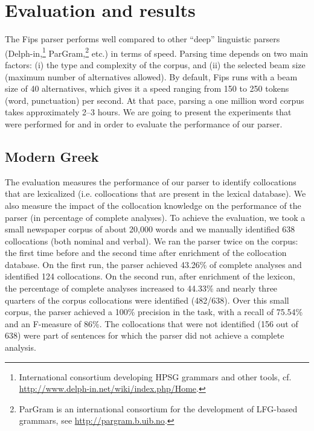 \documentclass[output=paper]{langsci/langscibook}
\begin{document}
\section{Evaluation and results}
\label{fou:sec6}
The Fips parser performs well compared to other ``deep'' linguistic parsers (Delph-in,\footnote{International consortium developing HPSG grammars and other tools, cf. \url{http://www.delph-in.net/wiki/index.php/Home}.} ParGram,\footnote{ParGram is an international consortium for the development of LFG-based grammars, see \url{http://pargram.b.uib.no}.} etc.) in terms of speed. Parsing time depends on two main factors: (i) the type and complexity of the corpus, and (ii) the selected beam size (maximum number of alternatives allowed). By default, Fips runs with a beam size of 40 alternatives, which gives it a speed ranging from 150 to 250 tokens (word, punctuation) per second. At that pace, parsing a one million word corpus takes approximately 2--3 hours. We are going to present the experiments that were performed for  and  in order to evaluate the performance of our parser. 

\subsection{Modern Greek}
The evaluation measures the performance of our parser to identify collocations that are lexicalized (i.e. collocations that are present in the lexical database). We also measure the impact of the collocation knowledge on the performance of the parser (in percentage of complete analyses). To achieve the evaluation, we took a small newspaper corpus of about 20,000 words  and we manually identified 638 collocations (both nominal and verbal). We ran the parser twice on the corpus: the first time before and the second time after enrichment of the collocation database. 
On the first run, the parser achieved 43.26\% of complete analyses and identified 124 collocations. On the second run, after enrichment of the lexicon, the percentage of complete analyses increased to 44.33\% and nearly three quarters of the corpus collocations were identified (482/638). Over this small corpus, the parser achieved a 100\% precision in the  task, with a recall of 75.54\% and an F-measure of 86\%. The collocations that were not identified (156 out of 638) were part of sentences for which the parser did not achieve a complete analysis.
	
\end{document}
